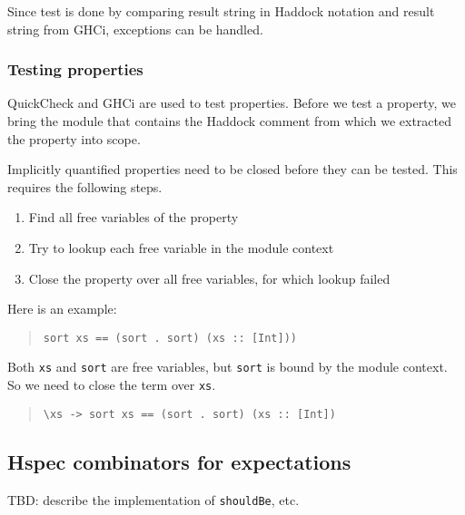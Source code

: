 \documentclass[preprint]{sigplanconf}
\begin{document}
Since test is done by comparing result string in Haddock notation and
result string from GHCi, exceptions can be handled.

\subsubsection{Testing properties}

\noindent QuickCheck and GHCi are used to test properties.  Before we
test a property, we bring the module that contains the Haddock comment
from which we extracted the property into scope.

Implicitly quantified properties need to be closed before they can be
tested.  This requires the following steps.
\begin{enumerate}
    \item
        Find all free variables of the property
    \item
        Try to lookup each free variable in the module context
    \item
        Close the property over all free variables, for which lookup
        failed
\end{enumerate}

\noindent Here is an example:

\begin{quote}\small\begin{verbatim}
sort xs == (sort . sort) (xs :: [Int]))
\end{verbatim}\end{quote}

\noindent Both \verb|xs| and \verb|sort| are free variables, but
\verb|sort| is bound by the module context.  So we need to close the
term over \verb|xs|.

\begin{quote}\small\begin{verbatim}
\xs -> sort xs == (sort . sort) (xs :: [Int])
\end{verbatim}\end{quote}


\subsection{Hspec combinators for expectations}
\label{sec:hspec-comb}

TBD: describe the implementation of {\tt shouldBe}, etc.


\end{document}
